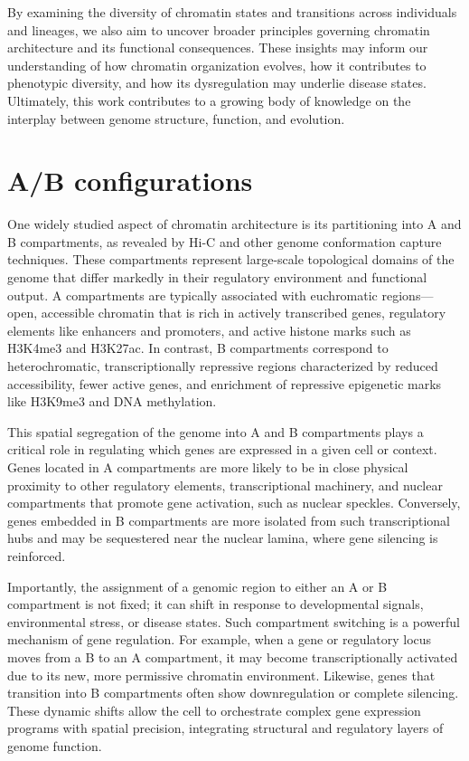 \documentclass[
  a4paper,
  openany]{scrbook}
\begin{document}
By examining the diversity of chromatin states and transitions across
individuals and lineages, we also aim to uncover broader principles
governing chromatin architecture and its functional consequences. These
insights may inform our understanding of how chromatin organization
evolves, how it contributes to phenotypic diversity, and how its
dysregulation may underlie disease states. Ultimately, this work
contributes to a growing body of knowledge on the interplay between
genome structure, function, and evolution.

\section{A/B configurations}\label{ab-configurations}

One widely studied aspect of chromatin architecture is its partitioning
into A and B compartments, as revealed by Hi-C and other genome
conformation capture techniques. These compartments represent
large-scale topological domains of the genome that differ markedly in
their regulatory environment and functional output. A compartments are
typically associated with euchromatic regions---open, accessible
chromatin that is rich in actively transcribed genes, regulatory
elements like enhancers and promoters, and active histone marks such as
H3K4me3 and H3K27ac. In contrast, B compartments correspond to
heterochromatic, transcriptionally repressive regions characterized by
reduced accessibility, fewer active genes, and enrichment of repressive
epigenetic marks like H3K9me3 and DNA methylation.

This spatial segregation of the genome into A and B compartments plays a
critical role in regulating which genes are expressed in a given cell or
context. Genes located in A compartments are more likely to be in close
physical proximity to other regulatory elements, transcriptional
machinery, and nuclear compartments that promote gene activation, such
as nuclear speckles. Conversely, genes embedded in B compartments are
more isolated from such transcriptional hubs and may be sequestered near
the nuclear lamina, where gene silencing is reinforced.

Importantly, the assignment of a genomic region to either an A or B
compartment is not fixed; it can shift in response to developmental
signals, environmental stress, or disease states. Such compartment
switching is a powerful mechanism of gene regulation. For example, when
a gene or regulatory locus moves from a B to an A compartment, it may
become transcriptionally activated due to its new, more permissive
chromatin environment. Likewise, genes that transition into B
compartments often show downregulation or complete silencing. These
dynamic shifts allow the cell to orchestrate complex gene expression
programs with spatial precision, integrating structural and regulatory
layers of genome function.
\end{document}
